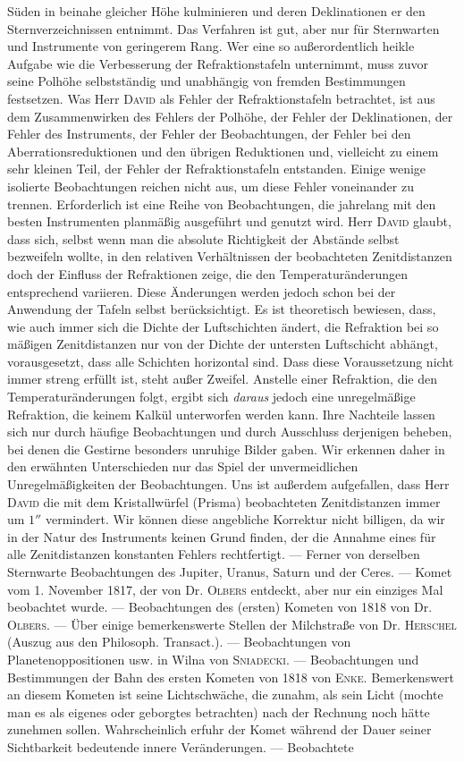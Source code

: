 Süden in beinahe gleicher Höhe kulminieren und deren Deklinationen er den Sternverzeichnissen entnimmt. Das Verfahren ist gut, aber nur für Sternwarten und Instrumente von geringerem Rang. Wer eine so außerordentlich heikle Aufgabe wie die Verbesserung der Refraktionstafeln unternimmt, muss zuvor seine Polhöhe selbstständig und unabhängig von fremden Bestimmungen festsetzen. Was Herr \textsc{David} als Fehler der Refraktionstafeln betrachtet, ist aus dem Zusammenwirken des Fehlers der Polhöhe, der Fehler der Deklinationen, der Fehler des Instruments, der Fehler der Beobachtungen, der Fehler bei den Aberrationsreduktionen und den übrigen Reduktionen und, vielleicht zu einem sehr kleinen Teil, der Fehler der Refraktionstafeln entstanden. Einige wenige isolierte Beobachtungen reichen nicht aus, um diese Fehler voneinander zu trennen. Erforderlich ist eine Reihe von Beobachtungen, die jahrelang mit den besten Instrumenten planmäßig ausgeführt und genutzt wird. Herr \textsc{David} glaubt, dass sich, selbst wenn man die absolute Richtigkeit der Abstände selbst bezweifeln wollte, in den relativen Verhältnissen der beobachteten Zenitdistanzen doch der Einfluss der Refraktionen zeige, die den Temperaturänderungen entsprechend variieren. Diese Änderungen werden jedoch schon bei der Anwendung der Tafeln selbst berücksichtigt. Es ist theoretisch bewiesen, dass, wie auch immer sich die Dichte der Luftschichten ändert, die Refraktion bei so mäßigen Zenitdistanzen nur von der Dichte der untersten Luftschicht abhängt, vorausgesetzt, dass alle Schichten horizontal sind. Dass diese Voraussetzung nicht immer streng erfüllt ist, steht außer Zweifel. Anstelle einer Refraktion, die den Temperaturänderungen folgt, ergibt sich \emph{daraus} jedoch eine unregelmäßige Refraktion, die keinem Kalkül unterworfen werden kann. Ihre Nachteile lassen sich nur durch häufige Beobachtungen und durch Ausschluss derjenigen beheben, bei denen die Gestirne besonders unruhige Bilder gaben. Wir erkennen daher in den erwähnten Unterschieden nur das Spiel der unvermeidlichen Unregelmäßigkeiten der Beobachtungen. Uns ist außerdem aufgefallen, dass Herr \textsc{David} die mit dem Kristallwürfel (Prisma) beobachteten Zenitdistanzen immer um $1''$ vermindert. Wir können diese angebliche Korrektur nicht billigen, da wir in der Natur des Instruments keinen Grund finden, der die Annahme eines für alle Zenitdistanzen konstanten Fehlers rechtfertigt. --- Ferner von derselben Sternwarte Beobachtungen des Jupiter, Uranus, Saturn und der Ceres. --- Komet vom 1. November 1817, der von Dr. \textsc{Olbers} entdeckt, aber nur ein einziges Mal beobachtet wurde. --- Beobachtungen des (ersten) Kometen von 1818 von Dr. \textsc{Olbers}. --- Über einige bemerkenswerte Stellen der Milchstraße von Dr. \textsc{Herschel} (Auszug aus den Philosoph. Transact.). --- Beobachtungen von Planetenoppositionen usw. in Wilna von \textsc{Sniadecki}. --- Beobachtungen und Bestimmungen der Bahn des ersten Kometen von 1818 von \textsc{Enke}. Bemerkenswert an diesem Kometen ist seine Lichtschwäche, die zunahm, als sein Licht (mochte man es als eigenes oder geborgtes betrachten) nach der Rechnung noch hätte zunehmen sollen. Wahrscheinlich erfuhr der Komet während der Dauer seiner Sichtbarkeit bedeutende innere Veränderungen. --- Beobachtete 